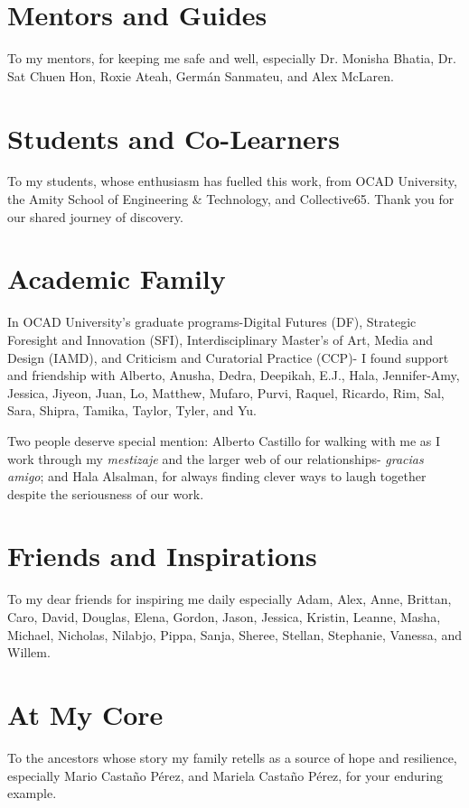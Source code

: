 \section*{Mentors and Guides}
To my mentors, for keeping me safe and well, especially Dr. Monisha Bhatia, Dr. Sat Chuen Hon, Roxie Ateah, Germán Sanmateu, and Alex McLaren.

\section*{Students and Co-Learners}
To my students, whose enthusiasm has fuelled this work, from OCAD University, the Amity School of Engineering \& Technology, and Collective65. Thank you for our shared journey of discovery.

\section*{Academic Family}
In OCAD University's graduate programs-Digital Futures (DF), Strategic Foresight and Innovation (SFI), Interdisciplinary Master's of Art, Media and Design (IAMD), and Criticism and Curatorial Practice (CCP)- I found support and friendship with Alberto, Anusha, Dedra, Deepikah, E.J., Hala, Jennifer-Amy, Jessica, Jiyeon, Juan, Lo, Matthew, Mufaro, Purvi, Raquel, Ricardo, Rim, Sal, Sara, Shipra, Tamika, Taylor, Tyler, and Yu.

Two people deserve special mention: Alberto Castillo for walking with me as I work through my \textit{mestizaje} and the larger web of our relationships- \textit{gracias amigo}; and Hala Alsalman, for always finding clever ways to laugh together despite the seriousness of our work.

\section*{Friends and Inspirations}
To my dear friends for inspiring me daily especially Adam, Alex, Anne, Brittan, Caro, David, Douglas, Elena, Gordon, Jason, Jessica, Kristin, Leanne, Masha, Michael, Nicholas, Nilabjo, Pippa, Sanja, Sheree, Stellan, Stephanie, Vanessa, and Willem.

\section*{At My Core}
To the ancestors whose story my family retells as a source of hope and resilience, especially Mario Castaño Pérez, and Mariela Castaño Pérez, for your enduring example. 

